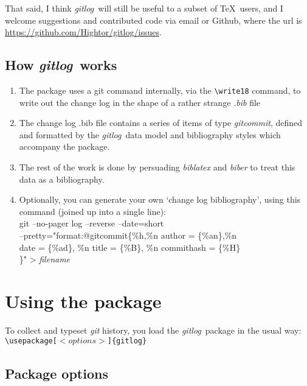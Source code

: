 \documentclass[a4paper,12pt,twoside,openany]{memoir}
\newcommand{\tcmd}[1]{\texttt{\textbackslash#1}}
\newcommand{\sfit}[1]{\textit{#1}}
\newcommand{\git}{\sfit{git}}
\newcommand{\tpname}{\sfit{gitlog}}
\begin{document}
\noindent 
That said, I think \tpname\ will still be useful to a subset of \TeX\ users,
and I welcome suggestions and contributed code via email or Github, where the url is 
\url{https://github.com/Hightor/gitlog/issues}.


\section{How \tpname\ works}
\begin{enumerate}
\item The package uses a git command internally, via the \tcmd{write18} command,
to write out the change log in the shape of a rather strange
\sfit{.bib} file

\item The change log .bib file contains a series of items of type \sfit{gitcommit},
defined and formatted by the \tpname\ 
data model and bibliography styles which accompany the package.

\item The rest of the work is done by persuading \sfit{biblatex} and \sfit{biber}
to treat this data as a bibliography.

\item Optionally, you can generate your own `change log bibliography', 
using this command (joined up into a single line):\\[\baselineskip]
{\ttfamily
git --no-pager log --reverse --date=short\\ 
--pretty="format:@gitcommit\{\%h,\%n author = \{\%an\},\%n\\
date = \{\%ad\}, \%n title = \{\%B\}, \%n commithash = \{\%H\}\\
\}" > \textit{filename}
}

\end{enumerate}

\chapter{Using the package}
\label{ch:using}
To collect and typeset \git{} history,
you load the \tpname\ package in the usual way:\\[0.5\baselineskip]
\texttt{\textbackslash usepackage[$<options>$]\{gitlog\}}

\section{Package options}
\end{document}
